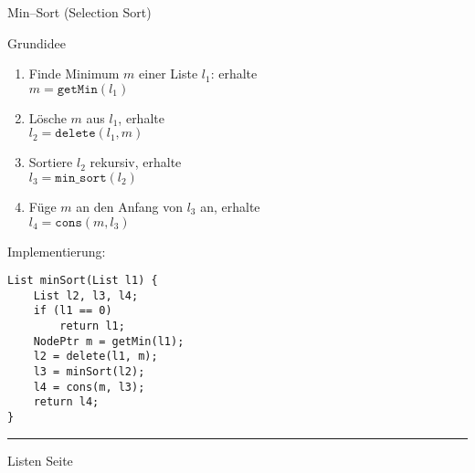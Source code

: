 \begin{slide}{}
\normalsize

\begin{center}
Min--Sort (Selection Sort)
\end{center}
\vspace*{0.5cm}

\footnotesize
Grundidee
\begin{enumerate}
\item Finde Minimum $m$ einer Liste $l_1$: erhalte \\[0.3cm]
      \hspace*{1.3cm} $m = \mathtt{getMin}(l_1)$
\item L\"osche $m$ aus $l_1$, erhalte \\[0.3cm]
      \hspace*{1.3cm}  $l_2 = \mathtt{delete}(l_1, m)$
\item Sortiere $l_2$ rekursiv, erhalte \\[0.3cm]
      \hspace*{1.3cm}  $l_3 = \mathtt{min\_sort}(l_2)$
\item F\"uge $m$ an den Anfang von $l_3$ an, erhalte \\[0.3cm]
      \hspace*{1.3cm}  $l_4 = \mathtt{cons}(m, l_3)$
\end{enumerate}
Implementierung:
\begin{verbatim}
List minSort(List l1) {
    List l2, l3, l4;
    if (l1 == 0)
        return l1;
    NodePtr m = getMin(l1);
    l2 = delete(l1, m);
    l3 = minSort(l2);
    l4 = cons(m, l3);
    return l4;
}
\end{verbatim}

\vspace*{\fill}
\tiny \addtocounter{mypage}{1}
\rule{17cm}{1mm}
Listen  \hspace*{\fill} Seite 
\end{slide}


